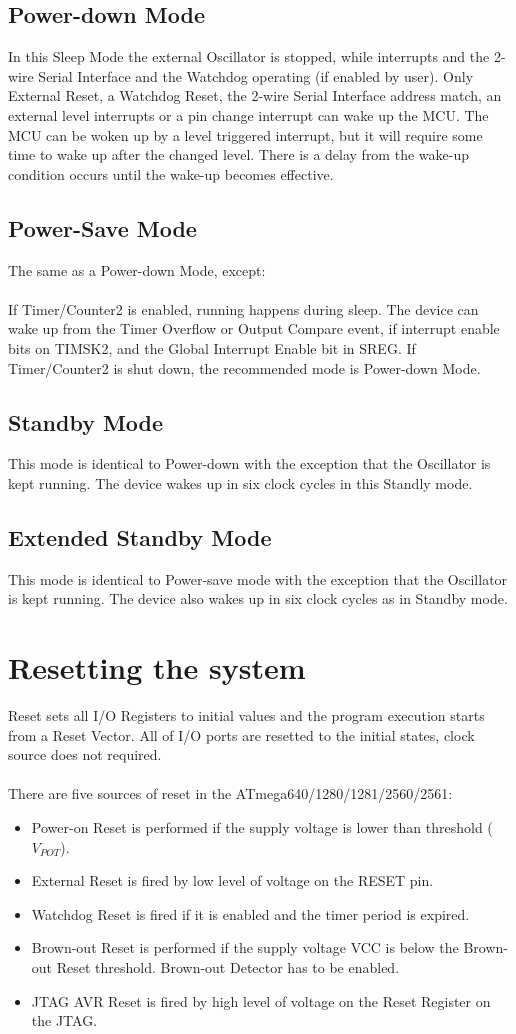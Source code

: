 \documentclass[english]{article}
\begin{document}
\subsection{Power-down Mode}
In this Sleep Mode the external Oscillator is stopped, while interrupts and the 2-wire Serial Interface and the Watchdog operating (if enabled by user). Only External Reset, a Watchdog
Reset, the 2-wire Serial Interface address match, an external level interrupts or a pin change interrupt can wake up the MCU. The MCU can be woken up by a level triggered interrupt, but it will require some time to wake up after the changed level. There is a delay from the wake-up condition occurs until the wake-up becomes effective.
\subsection{Power-Save Mode}
The same as a Power-down Mode, except:\\\\
If Timer/Counter2 is enabled, running happens during sleep. The device can wake up from the Timer Overflow or Output Compare event, if interrupt enable bits on TIMSK2, and the Global Interrupt Enable bit in SREG. If Timer/Counter2 is shut down, the recommended mode is Power-down Mode.
\subsection{Standby Mode}
This mode is identical to Power-down with the exception that the Oscillator is kept running. The device wakes up in six clock cycles in this Standly mode.
\subsection{Extended Standby Mode}
This mode is identical to Power-save mode with the exception that the Oscillator is kept running. The device also wakes up in six clock cycles as in Standby mode.
\section{Resetting the system}
Reset sets all I/O Registers to initial values and the program execution starts from a Reset Vector.
All of I/O ports are resetted to the initial states, clock source does not required.\\\\

There are five sources of reset in the ATmega640/1280/1281/2560/2561:
\begin{itemize}
\item Power-on Reset is performed if the supply voltage is lower than threshold ($V_{POT}$).
\item External Reset is fired by low level of voltage on the RESET pin.
\item Watchdog Reset is fired if it is enabled and the timer period is expired.
\item  Brown-out Reset is performed if the supply voltage VCC is below the Brown-out Reset threshold. Brown-out Detector has to be enabled.
\item  JTAG AVR Reset is fired by high level of voltage on the Reset Register on the JTAG.
\end{itemize}
\end{document}
